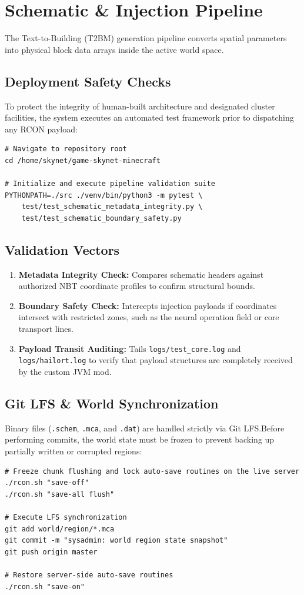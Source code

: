 \chapter{Schematic \& Injection Pipeline}

The Text-to-Building (T2BM) generation pipeline converts spatial parameters into physical block data arrays inside the active world space.

\section{Deployment Safety Checks}
To protect the integrity of human-built architecture and designated cluster facilities, the system executes an automated test framework prior to dispatching any RCON payload:

\begin{lstlisting}[style=bashstyle, caption={Pre-deployment Verification Command Line}]
# Navigate to repository root
cd /home/skynet/game-skynet-minecraft

# Initialize and execute pipeline validation suite
PYTHONPATH=./src ./venv/bin/python3 -m pytest \
    test/test_schematic_metadata_integrity.py \
    test/test_schematic_boundary_safety.py
\end{lstlisting}

\section{Validation Vectors}
\begin{enumerate}
    \item \textbf{Metadata Integrity Check:} Compares schematic headers against authorized NBT coordinate profiles to confirm structural bounds.
    \item \textbf{Boundary Safety Check:} Intercepts injection payloads if coordinates intersect with restricted zones, such as the neural operation field or core transport lines.
    \item \textbf{Payload Transit Auditing:} Tails \texttt{logs/test_core.log} and \texttt{logs/hailort.log} to verify that payload structures are completely received by the custom JVM mod.
\end{enumerate}

\section{Git LFS \& World Synchronization}
Binary files (\texttt{.schem}, \texttt{.mca}, and \texttt{.dat}) are handled strictly via Git LFS.\@ Before performing commits, the world state must be frozen to prevent backing up partially written or corrupted regions:

\begin{lstlisting}[style=bashstyle, caption={World Freeze and Sync Protocol}]
# Freeze chunk flushing and lock auto-save routines on the live server
./rcon.sh "save-off"
./rcon.sh "save-all flush"

# Execute LFS synchronization
git add world/region/*.mca
git commit -m "sysadmin: world region state snapshot"
git push origin master

# Restore server-side auto-save routines
./rcon.sh "save-on"
\end{lstlisting}